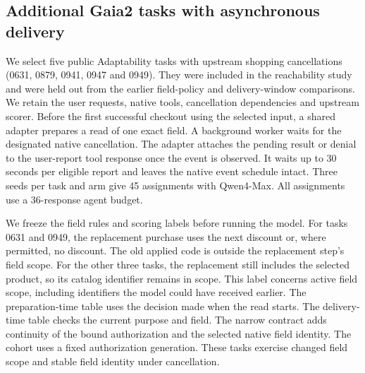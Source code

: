 \subsection{Additional Gaia2 tasks with asynchronous delivery}
\label{sec:gaia-async-followup}

We select five public Adaptability tasks with upstream shopping cancellations (0631, 0879, 0941, 0947 and 0949). They were included in the reachability study and were held out from the earlier field-policy and delivery-window comparisons. We retain the user requests, native tools, cancellation dependencies and upstream scorer. Before the first successful checkout using the selected input, a shared adapter prepares a read of one exact field. A background worker waits for the designated native cancellation. The adapter attaches the pending result or denial to the user-report tool response once the event is observed. It waits up to 30 seconds per eligible report and leaves the native event schedule intact. Three seeds per task and arm give 45 assignments with Qwen4-Max. All assignments use a 36-response agent budget.

We freeze the field rules and scoring labels before running the model. For tasks 0631 and 0949, the replacement purchase uses the next discount or, where permitted, no discount. The old applied code is outside the replacement step's field scope. For the other three tasks, the replacement still includes the selected product, so its catalog identifier remains in scope. This label concerns active field scope, including identifiers the model could have received earlier. The preparation-time table uses the decision made when the read starts. The delivery-time table checks the current purpose and field. The narrow contract adds continuity of the bound authorization and the selected native field identity. The cohort uses a fixed authorization generation. These tasks exercise changed field scope and stable field identity under cancellation.

